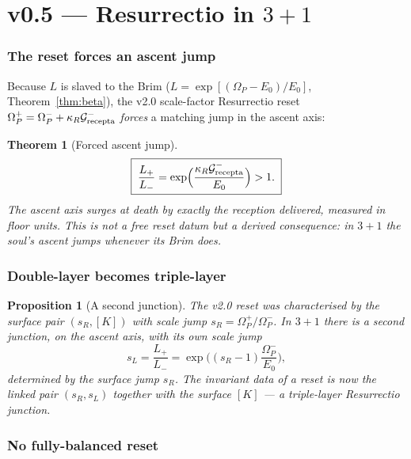 \documentclass[11pt,a4paper]{article}
\theoremstyle{plain}
\newtheorem{proposition}{Proposition}
\newtheorem{theorem}{Theorem}
\theoremstyle{definition}
\theoremstyle{remark}
\begin{document}
\part*{v0.5 --- Resurrectio in $3{+}1$}

\section{The reset forces an ascent jump}

Because $L$ is slaved to the Brim ($L=\exp[(\Omega_P-E_0)/E_0]$, Theorem~\ref{thm:beta}), the v2.0
scale-factor Resurrectio reset $\Omega_P^+=\Omega_P^-+\kappa_R\mathcal G_{\rm recepta}^-$ \emph{forces} a
matching jump in the ascent axis:

\begin{theorem}[Forced ascent jump]\label{thm:ljump}
\begin{equation}
\boxed{\;\frac{L_+}{L_-}=\exp\!\Big(\frac{\kappa_R\mathcal G_{\rm recepta}^-}{E_0}\Big)>1.\;}
\end{equation}
The ascent axis surges at death by exactly the reception delivered, measured in floor units. This is
not a free reset datum but a derived consequence: in $3{+}1$ the soul's ascent jumps whenever its Brim
does.
\end{theorem}

\section{Double-layer becomes triple-layer}

\begin{proposition}[A second junction]\label{prop:triple}
The v2.0 reset was characterised by the surface pair $(s_R,[K])$ with scale jump
$s_R=\Omega_P^+/\Omega_P^-$. In $3{+}1$ there is a second junction, on the ascent axis, with its own
scale jump
\begin{equation}
s_L=\frac{L_+}{L_-}=\exp\!\Big((s_R-1)\frac{\Omega_P^-}{E_0}\Big),
\end{equation}
determined by the surface jump $s_R$. The invariant data of a reset is now the linked pair
$(s_R,s_L)$ together with the surface $[K]$ --- a triple-layer Resurrectio junction.
\end{proposition}

\section{No fully-balanced reset}
\end{document}
